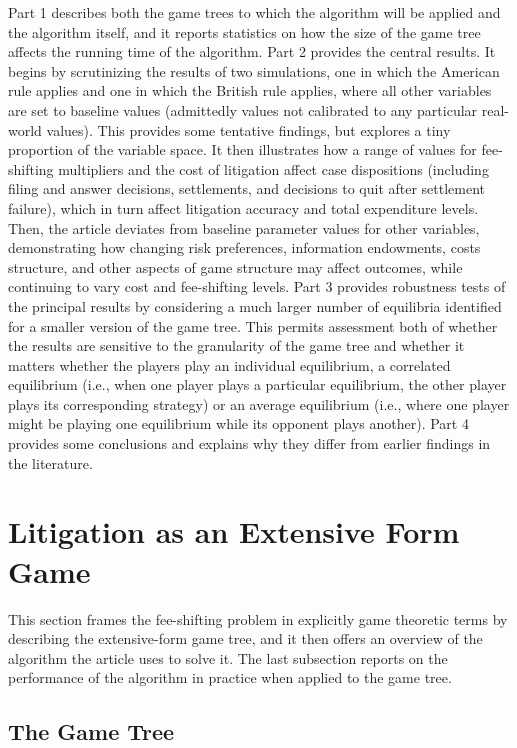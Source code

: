 \documentclass{article}
\begin{document}
Part 1 describes both the game trees to which the algorithm will be applied and the algorithm itself, and it reports statistics on how the size of the game tree affects the running time of the algorithm. Part 2 provides the central results. It begins by scrutinizing the results of two simulations, one in which the American rule applies and one in which the British rule applies, where all other variables are set to baseline values (admittedly values not calibrated to any particular real-world values). This provides some tentative findings, but explores a tiny proportion of the variable space. It then illustrates how a range of values for fee-shifting multipliers and the cost of litigation affect case dispositions (including filing and answer decisions, settlements, and decisions to quit after settlement failure), which in turn affect litigation accuracy and total expenditure levels. Then, the article deviates from baseline parameter values for other variables, demonstrating how changing risk preferences, information endowments, costs structure, and other aspects of game structure may affect outcomes, while continuing to vary cost and fee-shifting levels. Part 3 provides robustness tests of the principal results by considering a much larger number of equilibria identified for a smaller version of the game tree. This permits assessment both of whether the results are sensitive to the granularity of the game tree and whether it matters whether the players play an individual equilibrium, a correlated equilibrium (i.e., when one player plays a particular equilibrium, the other player plays its corresponding strategy) or an average equilibrium (i.e., where one player might be playing one equilibrium while its opponent plays another). Part 4 provides some conclusions and explains why they differ from earlier findings in the literature.

\section{Litigation as an Extensive Form Game}

This section frames the fee-shifting problem in explicitly game theoretic terms by describing the extensive-form game tree, and it then offers an overview of the algorithm the article uses to solve it. The last subsection reports on the performance of the algorithm in practice when applied to the game tree. 

\subsection{The Game Tree} \label{gametree}
\end{document}
